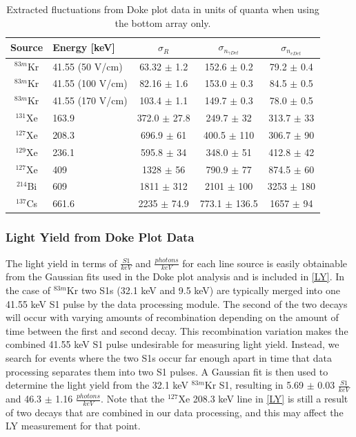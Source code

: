 \documentclass[a4paper,12pt]{article}
\begin{document}
{\begin{center}
\begin{table}[H]
\begin{tabular}{ | c| p{40mm} | c | c | c | }
\hline
Source & Energy [keV] & $\sigma_{R}$ & $\sigma_{n_{\gamma Det}}$ & $\sigma_{n_{e Det}}$ \\ \hline
$^{83m}$Kr & 41.55 (50 V/cm) & 63.32 $\pm$ 1.2 & 152.6 $\pm$ 0.2 & 79.2 $\pm$ 0.4\\  \hline
$^{83m}$Kr & 41.55 (100 V/cm) & 82.16 $\pm$ 1.6 & 153.0 $\pm$ 0.3 & 84.5 $\pm$ 0.5\\  \hline
$^{83m}$Kr & 41.55 (170 V/cm) & 103.4 $\pm$ 1.1 & 149.7 $\pm$ 0.3 & 78.0 $\pm$ 0.5\\  \hline
$^{131}$Xe & 163.9 & 372.0 $\pm$ 27.8 & 249.7 $\pm$ 32 & 313.7 $\pm$ 33\\  \hline
$^{127}$Xe & 208.3 & 696.9 $\pm$ 61 & 400.5 $\pm$ 110 & 306.7 $\pm$ 90\\  \hline
$^{129}$Xe & 236.1 & 595.8 $\pm$ 34 & 348.0 $\pm$ 51 & 412.8 $\pm$ 42\\  \hline
$^{127}$Xe & 409 & 1328  $\pm$ 56 & 790.9 $\pm$ 77 & 874.5 $\pm$ 60\\  \hline
$^{214}$Bi & 609 & 1811 $\pm$ 312 & 2101 $\pm$ 100 & 3253 $\pm$ 180\\  \hline
$^{137}$Cs & 661.6 & 2235 $\pm$ 74.9 & 773.1 $\pm$ 136.5 & 1657 $\pm$ 94\\ 
\hline
\end{tabular}
\caption{Extracted fluctuations from Doke plot data in units of quanta when using the bottom array only.}
\label{SigRBot}
\end{table}
\end{center}


\subsubsection{Light Yield from Doke Plot Data}

The light yield in terms of $\frac{S1}{keV}$ and $\frac{photons}{keV}$ for each line source is easily obtainable from the Gaussian fits used in the Doke plot analysis and is included in \ref{LY}.  In the case of $^{83m}$Kr two S1s (32.1 keV and 9.5 keV) are typically merged into one 41.55 keV S1 pulse by the data processing module.  The second of the two decays will occur with varying amounts of recombination depending on the amount of time between the first and second decay.  This recombination variation makes the combined 41.55 keV S1 pulse undesirable for measuring light yield.  Instead, we search for events where the two S1s occur far enough apart in time that data processing separates them into two S1 pulses.  A Gaussian fit is then used to determine the light yield from the 32.1 keV $^{83m}$Kr S1, resulting in 5.69 $\pm$ 0.03 $\frac{S1}{keV}$ and 46.3 $\pm$ 1.16 $\frac{photons}{keV}$. Note that the $^{127}$Xe 208.3 keV line in \ref{LY} is still a result of two decays that are combined in our data processing, and this may affect the LY measurement for that point.

}
\end{document}
